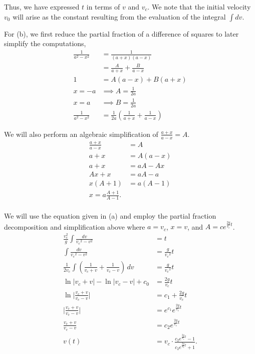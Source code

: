 \documentclass[../hw11]{subfiles}
\begin{document}
Thus, we have expressed $t$ in terms of $v$ and $v_c$. We note that the initial velocity $v_0$ will arise as the constant resulting from the evaluation of the integral $\int dv$.

For (b), we first reduce the partial fraction of a difference of squares to later simplify the computations,
\begin{align*}
    \frac{1}{a^2-x^2}&=\frac{1}{(a+x)(a-x)} \\
    &=\frac{A}{a+x}+\frac{B}{a-x} \\
    1&=A(a-x)+B(a+x) \\
    x=-a &\implies A=\frac{1}{2a} \\
    x=a &\implies B=\frac{1}{2a} \\
    \frac{1}{a^2-x^2}&=\frac{1}{2a}\left( \frac{1}{a+x}+\frac{1}{a-x} \right) 
\end{align*}

We will also perform an algebraic simplification of $\frac{a+x}{a-x}=A$.
\begin{align*}
    \frac{a+x}{a-x}&=A\\
    a+x&=A(a-x)\\
    a+x&=aA-Ax\\
    Ax+x&=aA-a \\
    x(A+1)&=a(A-1) \\
    x=a\frac{A+1}{A-1}. \\
\end{align*}

We will use the equation given in (a) and employ the partial fraction decomposition and simplification above where $a=v_c$, $x=v$, and $A=ce^{\frac{2g}{v_c}t}$.
\begin{align*}
    \frac{{v_c^2}}{g} \int \frac{dv}{{v_c}^2-v^2} &= t \\
    \int \frac{dv}{{v_c}^2-v^2} &= \frac{g}{{v_c}^2}t \\
    \frac{1}{2v_c} \int \left( \frac{1}{v_c+v}+\frac{1}{v_c-v} \right) \,dv &= \frac{g}{{v_c}^2}t \\
    \ln{|v_c+v|}-\ln{|v_c-v|} + c_0&= \frac{2g}{v_c}t \\
    \ln{\bigg|\frac{v_c+v}{v_c-v}\bigg|} &= c_1 + \frac{2g}{v_c}t\\
    \bigg|\frac{v_c+v}{v_c-v}\bigg| &= e^{c_1} e^{\frac{2g}{v_c}t} \\
    \frac{v_c+v}{v_c-v} &= c_2 e^{\frac{2g}{v_c}t} \\
    v(t)&=v_c\cdot\frac{c_2 e^{\frac{2g}{v_c}t}-1}{c_2 e^{\frac{2g}{v_c}t}+1}. \\
\end{align*}
\end{document}
